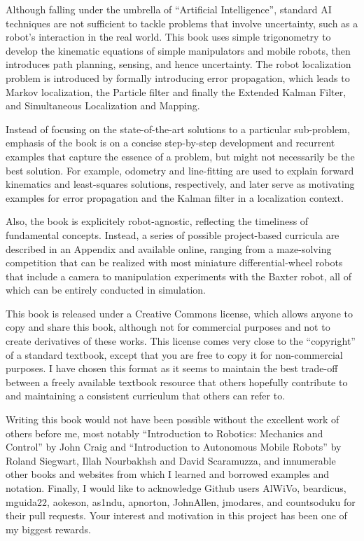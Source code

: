 \documentclass[paper=6.14in:9.21in,pagesize=pdftex,11pt,twoside,openright]{scrbook}
\begin{document}
Although falling under the umbrella of ``Artificial Intelligence'', standard AI techniques are not sufficient to tackle problems that involve uncertainty, such as a robot's interaction in the real world. This book uses simple trigonometry to develop the kinematic equations of simple manipulators and mobile robots, then introduces path planning, sensing, and hence uncertainty. The robot localization problem is introduced by formally introducing error propagation, which leads to Markov localization, the Particle filter and finally the Extended Kalman Filter, and Simultaneous Localization and Mapping.

Instead of focusing on the state-of-the-art solutions to a particular sub-problem, emphasis of the book is on a concise step-by-step development and recurrent examples that capture the essence of a problem, but might not necessarily be the best solution. For example, odometry and line-fitting are used to explain forward kinematics and least-squares solutions, respectively, and later serve as motivating examples for error propagation and the Kalman filter in a localization context.

Also, the book is explicitely robot-agnostic, reflecting the timeliness of fundamental concepts. Instead, a series of possible project-based curricula are described in an Appendix and available online, ranging from a maze-solving competition that can be realized with most miniature differential-wheel robots that include a camera to manipulation experiments with the Baxter robot, all of which can be entirely conducted in simulation.

This book is released under a Creative Commons license, which allows anyone to copy and share this book, although not for commercial purposes and not to create derivatives of these works. This license comes very close to the ``copyright'' of a standard textbook, except that you are free to copy it for non-commercial purposes. I have chosen this format as it seems to maintain the best trade-off between a freely available textbook resource that others hopefully contribute to and maintaining a consistent curriculum that others can refer to.

Writing this book would not have been possible without the excellent work of others before me, most notably ``Introduction to Robotics: Mechanics and Control'' by John Craig and ``Introduction to Autonomous Mobile Robots'' by Roland Siegwart, Illah Nourbakhsh and David Scaramuzza, and innumerable other books and websites from which I learned and borrowed examples and notation. Finally, I would like to acknowledge Github users AlWiVo, beardicus, mguida22, aokeson, as1ndu, apnorton, JohnAllen, jmodares, and countsoduku for their pull requests. Your interest and motivation in this project has been one of my biggest rewards.
\end{document}
